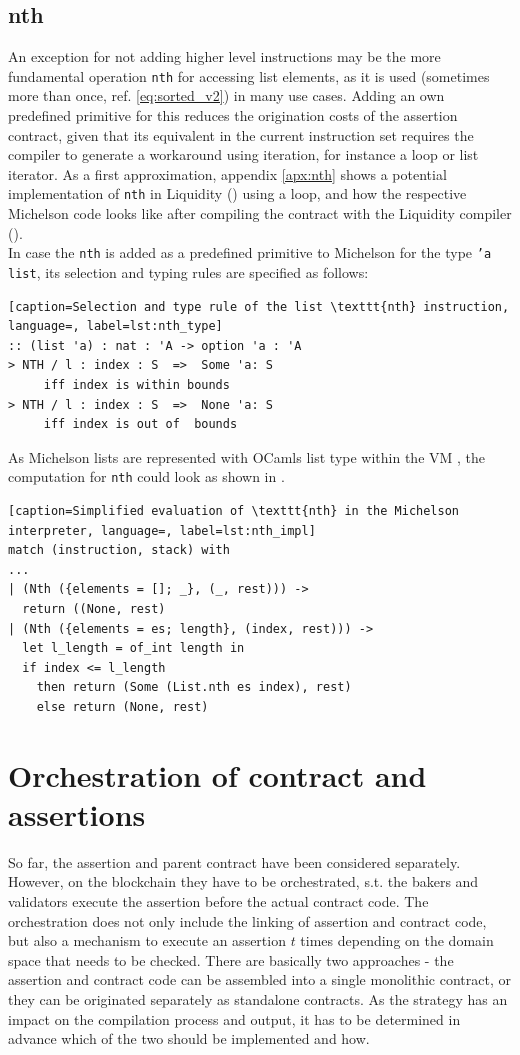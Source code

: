 \subsection{nth}
An exception for not adding higher level instructions may be the more fundamental operation \texttt{nth} for accessing list elements, as it is used (sometimes more than once, ref. \eqref{eq:sorted_v2}) in many use cases. Adding an own predefined primitive for this reduces the origination costs of the assertion contract, given that its equivalent in the current instruction set requires the compiler to generate a workaround using iteration, for instance a loop or list iterator. As a first approximation, appendix \ref{apx:nth} shows a potential implementation of \texttt{nth} in Liquidity () using a loop, and how the respective Michelson code looks like after compiling the contract with the Liquidity compiler (). \\
In case the \texttt{nth} is added as a predefined primitive to Michelson for the type \texttt{'a list}, its selection and typing rules are specified as follows:
\begin{lstlisting}[caption=Selection and type rule of the list \texttt{nth} instruction, language=, label=lst:nth_type]
:: (list 'a) : nat : 'A -> option 'a : 'A
> NTH / l : index : S  =>  Some 'a: S
     iff index is within bounds
> NTH / l : index : S  =>  None 'a: S
     iff index is out of  bounds
\end{lstlisting}
As Michelson lists are represented with OCamls list type within the VM \cite{tezos_repo}, the computation for \texttt{nth} could look as shown in .
\begin{lstlisting}[caption=Simplified evaluation of \texttt{nth} in the Michelson interpreter, language=, label=lst:nth_impl]
match (instruction, stack) with
...
| (Nth ({elements = []; _}, (_, rest))) ->
  return ((None, rest)
| (Nth ({elements = es; length}, (index, rest))) ->
  let l_length = of_int length in
  if index <= l_length
    then return (Some (List.nth es index), rest)
    else return (None, rest)
\end{lstlisting}
\lstset{upquote=false}

\section{Orchestration of contract and assertions}
So far, the assertion and parent contract have been considered separately. However, on the blockchain they have to be orchestrated, s.t. the bakers and validators execute the assertion before the actual contract code. The orchestration does not only include the linking of assertion and contract code, but also a mechanism to execute an assertion $t$ times depending on the domain space that needs to be checked. There are basically two approaches - the assertion and contract code can be assembled into a single monolithic contract, or they can be originated separately as standalone contracts. As the strategy has an impact on the compilation process and output, it has to be determined in advance which of the two should be implemented and how.

